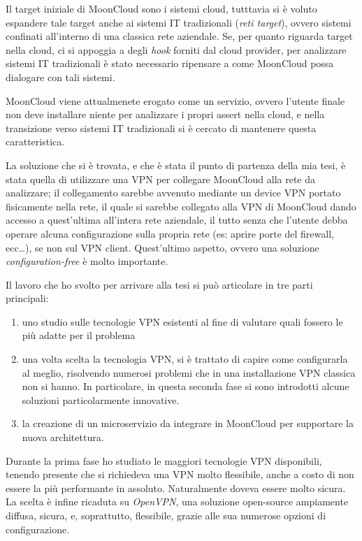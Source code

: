 \documentclass[10pt,a4paper]{article}
\begin{document}
        Il target iniziale di MoonCloud sono i sistemi cloud, tutttavia si è voluto espandere
        tale target anche ai sistemi IT tradizionali (\textit{reti target}), ovvero sistemi
        confinati all'interno di una classica rete aziendale. Se, per quanto riguarda target nella
        cloud, ci si appoggia a degli \textit{hook} forniti dal cloud provider, per analizzare
        sistemi IT tradizionali è stato necessario ripensare a come MoonCloud possa dialogare
        con tali sistemi.

        MoonCloud viene attualmenete erogato come un servizio, ovvero l'utente finale
        non deve installare niente per analizzare i propri assert nella cloud, e nella transizione
        verso sistemi IT tradizionali si è cercato di mantenere questa caratteristica.


        La soluzione che si è trovata, e che è stata il punto di partenza della mia tesi,
        è stata quella di utilizzare una VPN per collegare MoonCloud alla rete
        da analizzare; il collegamento sarebbe avvenuto mediante un device VPN portato
        fisicamente nella rete, il quale si sarebbe collegato alla VPN di MoonCloud dando
        accesso a quest'ultima all'intera rete aziendale, il tutto senza che
        l'utente debba operare alcuna configurazione sulla propria rete (es: aprire porte
        del firewall, ecc\ldots), se non sul VPN client. Quest'ultimo aspetto, ovvero
        una soluzione \textit{configuration-free} è molto importante.

        Il lavoro che ho svolto per arrivare alla tesi si può articolare in tre parti principali:
        \begin{enumerate}
            \item uno studio sulle tecnologie VPN esistenti al fine di valutare quali
            fossero le più adatte per il problema
            \item una volta scelta la tecnologia VPN, si è trattato di capire come
            configurarla al meglio, risolvendo numerosi problemi che in una
            installazione VPN classica non si hanno. In particolare, in questa seconda
            fase si sono introdotti alcune soluzioni particolarmente innovative.
            \item la creazione di un microservizio da integrare in MoonCloud per
            supportare la nuova architettura.
        \end{enumerate}

        
        Durante la prima fase ho studiato le maggiori tecnologie VPN disponibili,
        tenendo presente che si richiedeva una VPN molto flessibile, anche a costo
        di non essere la più performante in assoluto. Naturalmente doveva essere
        molto sicura. La scelta è infine ricaduta su \textit{OpenVPN}, una soluzione open-source
        ampiamente diffusa, sicura, e, soprattutto, flessibile, grazie alle sua numerose
        opzioni di configurazione.
\end{document}
